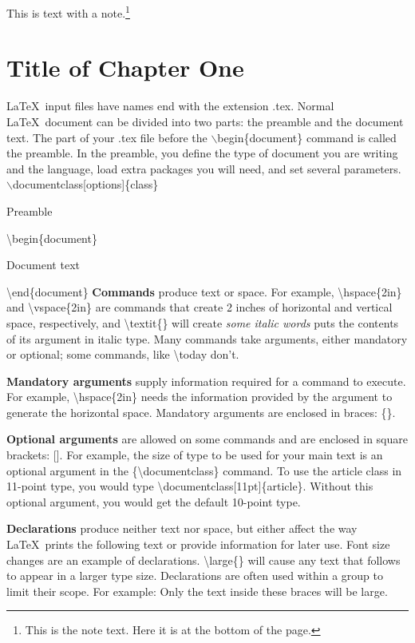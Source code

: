 \documentclass[a4paper,11pt,UTF8,openright]{book}
\begin{document}
This is text with a note.\footnote{This is the note text. Here it is at the bottom of the page.}



\mainmatter
\chapter{Title of Chapter One}

\LaTeX\ input files have names end with the extension .tex. Normal \LaTeX\ document can be divided into two parts: the preamble and the document text. The part of your .tex file before the $\backslash$begin\{document\} command is called the preamble. In the preamble, you define the type of document you are writing and the language, load extra packages you will need, and set several parameters. 
\vskip 0.2in
$\backslash$documentclass[options]\{class\}

Preamble

\textbackslash begin\{document\}

Document text
  
\textbackslash end\{document\}
\vskip 0.2in
\textbf{Commands} produce text or space. For example, \textbackslash hspace\{2in\} and \textbackslash vspace\{2in\} are commands that create 2 inches of horizontal and vertical space, respectively, and \textbackslash textit\{\} will create \textit{some italic words} puts the contents of its argument in italic type. Many commands take arguments, either mandatory or optional; some commands, like \textbackslash today don’t.

\textbf{Mandatory arguments} supply information required for a command to execute. For
example, \textbackslash hspace\{2in\} needs the information provided by the argument to generate the horizontal space. Mandatory arguments are enclosed in braces: \{\}.

\textbf{Optional arguments} are allowed on some commands and are enclosed in square brackets: []. For example, the size of type to be used for your main text is an optional
argument in the \{\textbackslash documentclass\} command. To use the article class in 11-point
type, you would type \textbackslash documentclass[11pt]\{article\}. Without this optional
argument, you would get the default 10-point type.


\textbf{Declarations} produce neither text nor space, but either affect the way \LaTeX\ prints the following text or provide information for later use. Font size changes are an
example of declarations. \textbackslash large\{\} will cause any text that follows to appear in a larger type size. Declarations are often used within a group to limit their scope. For
example: {\large Only the text inside these braces will be large.}
\end{document}
